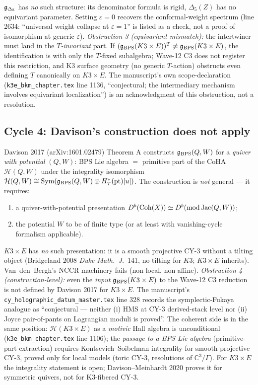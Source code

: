 $\mathfrak{g}_{\Delta_5}$ has \emph{no} such structure: its denominator formula is
rigid, $\Delta_5(Z)$ has no equivariant parameter. Setting
$\varepsilon = 0$ recovers the conformal-weight spectrum (line
2634: ``universal weight collapse at $\varepsilon = 1$'' is listed
as a check, not a proof of isomorphism at generic $\varepsilon$).
\emph{Obstruction 3 (equivariant mismatch):} the intertwiner
must land in the \emph{$T$-invariant} part. If
$(\mathfrak{g}_{\mathrm{BPS}}(K3 \times E))^T \neq \mathfrak{g}_{\mathrm{BPS}}(K3 \times E)$, the identification is with only the
$T$-fixed subalgebra; Wave-12 C3 does not register this
restriction, and K3 surface geometry (no generic $T$-action)
obstructs even defining $T$ canonically on $K3 \times E$. The
manuscript's own scope-declaration (\texttt{k3e\_bkm\_chapter.tex}
line 1136, ``conjectural; the intermediary mechanism involves
equivariant localization'') is an acknowledgment of this obstruction,
not a resolution.

\subsection*{Cycle 4: Davison's construction does not apply}

Davison 2017 (arXiv:1601.02479) Theorem A constructs
$\mathfrak{g}_{\mathrm{BPS}}(Q, W)$ for a \emph{quiver with potential}
$(Q, W)$: BPS Lie algebra $=$ primitive part of the CoHA
$\mathcal{H}(Q, W)$ under the integrality isomorphism
$\mathcal{H}(Q, W) \cong \mathrm{Sym}(\mathfrak{g}_{\mathrm{BPS}}(Q,W) \otimes
H^*_T(\mathrm{pt})[u])$. The construction is \emph{not}
general --- it requires:
\begin{enumerate}
\item a quiver-with-potential presentation
  $D^b(\mathrm{Coh}(X)) \simeq D^b(\mathrm{mod}\,\mathrm{Jac}(Q, W))$;
\item the potential $W$ to be of finite type (or at least with
  vanishing-cycle formalism applicable).
\end{enumerate}
$K3 \times E$ has \emph{no} such presentation: it is a smooth
projective CY-3 without a tilting object (Bridgeland 2008 \emph{Duke
  Math.\ J.}\ 141, no tilting for $K3$; $K3 \times E$ inherits).
Van~den~Bergh's NCCR machinery fails (non-local, non-affine).
\emph{Obstruction 4 (construction-level):} even the \emph{input}
$\mathfrak{g}_{\mathrm{BPS}}(K3 \times E)$ to the Wave-12 C3 reduction is not defined by Davison 2017
for $K3 \times E$. The manuscript's
\texttt{cy\_holographic\_datum\_master.tex} line 328 records the
symplectic-Fukaya analogue as ``conjectural --- neither (i) HMS at
CY-3 derived-stack level nor (ii) Joyce pair-of-pants on Lagrangian
moduli is proved''. The coherent side is in the same position:
$\mathcal{H}(K3 \times E)$ as a \emph{motivic} Hall algebra is
unconditional (\texttt{k3e\_bkm\_chapter.tex} line 1106); the
\emph{passage to a BPS Lie algebra} (primitive-part extraction)
requires Kontsevich--Soibelman integrality for smooth projective
CY-3, proved only for local models (toric CY-3, resolutions of
$\mathbb{C}^3/\Gamma$). For $K3 \times E$ the integrality
statement is open; Davison--Meinhardt 2020 proves it for
symmetric quivers, not for K3-fibered CY-3.

